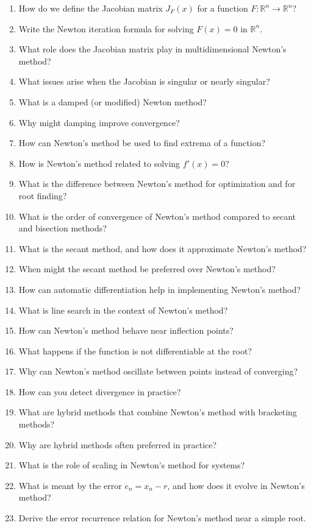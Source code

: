 \begin{enumerate}
  \item How do we define the Jacobian matrix $J_F(x)$ for a function $F : \mathbb{R}^n \to \mathbb{R}^n$?
  \item Write the Newton iteration formula for solving $F(x) = 0$ in $\mathbb{R}^n$.
  \item What role does the Jacobian matrix play in multidimensional Newton's method?
  \item What issues arise when the Jacobian is singular or nearly singular?
  \item What is a damped (or modified) Newton method?
  \item Why might damping improve convergence?
  \item How can Newton's method be used to find extrema of a function?
  \item How is Newton's method related to solving $f'(x) = 0$?
  \item What is the difference between Newton's method for optimization and for root finding?
  \item What is the order of convergence of Newton's method compared to secant and bisection methods?
  \item What is the secant method, and how does it approximate Newton's method?
  \item When might the secant method be preferred over Newton's method?
  \item How can automatic differentiation help in implementing Newton's method?
  \item What is line search in the context of Newton's method?
  \item How can Newton's method behave near inflection points?
  \item What happens if the function is not differentiable at the root?
  \item Why can Newton's method oscillate between points instead of converging?
  \item How can you detect divergence in practice?
  \item What are hybrid methods that combine Newton's method with bracketing methods?
  \item Why are hybrid methods often preferred in practice?
  \item What is the role of scaling in Newton's method for systems?
  \item What is meant by the error $e_n = x_n - r$, and how does it evolve in Newton's method?
  \item Derive the error recurrence relation for Newton's method near a simple root.

\end{enumerate}
